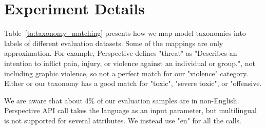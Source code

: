 \documentclass[letterpaper]{article} %
\begin{document}





%  

\section{Experiment Details}
\label{appendix:exp_details}

Table~\ref{ta:taxonomy_matching} presents how we map model taxonomies into labels of different evaluation datasets. Some of the mappings are only approximation. For example, Perspective defines "threat" as "Describes an intention to inflict pain, injury, or violence against an individual or group.", not including graphic violence, so not a perfect match for our "violence" category. Either or our taxonomy has a good match for "toxic", "severe toxic", or "offensive.

 We are aware that about 4\% of our evaluation samples are in non-English. Perspective API call takes the language as an input parameter, but multilingual is not supported for several attributes. We instead use "en" for all the calls. 
\end{document}
